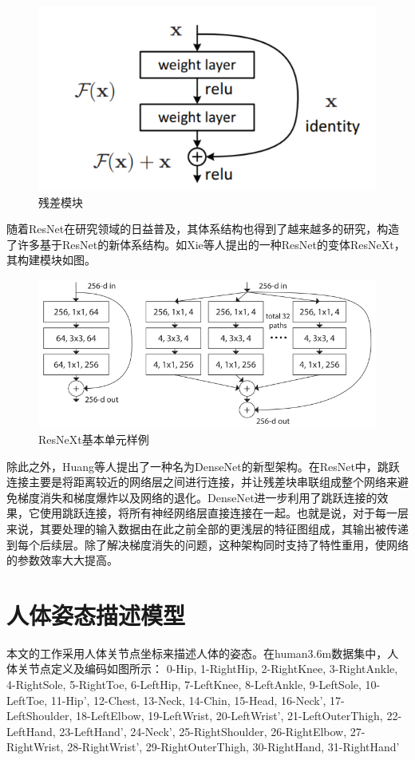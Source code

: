\begin{figure}[h]
	\centering
	\includegraphics[scale=0.4]{figures/10.png}
	\caption{残差模块}
	\label{fig:f10}
\end{figure}

随着ResNet在研究领域的日益普及，其体系结构也得到了越来越多的研究，构造了许多基于ResNet的新体系结构。如Xie等人提出的一种ResNet的变体ResNeXt，其构建模块如图。

\begin{figure}[h]
	\centering
	\includegraphics[scale=0.4]{figures/11.png}
	\caption{ResNeXt基本单元样例}
	\label{fig:f11}
\end{figure}

除此之外，Huang等人提出了一种名为DenseNet的新型架构。在ResNet中，跳跃连接主要是将距离较近的网络层之间进行连接，并让残差块串联组成整个网络来避免梯度消失和梯度爆炸以及网络的退化。DenseNet进一步利用了跳跃连接的效果，它使用跳跃连接，将所有神经网络层直接连接在一起。也就是说，对于每一层来说，其要处理的输入数据由在此之前全部的更浅层的特征图组成，其输出被传递到每个后续层。除了解决梯度消失的问题，这种架构同时支持了特性重用，使网络的参数效率大大提高。



\section{人体姿态描述模型}
本文的工作采用人体关节点坐标来描述人体的姿态。在human3.6m数据集中，人体关节点定义及编码如图所示：
0-Hip, 1-RightHip, 2-RightKnee, 3-RightAnkle, 4-RightSole, 5-RightToe, 6-LeftHip, 7-LeftKnee, 8-LeftAnkle, 9-LeftSole, 10-LeftToe, 11-Hip’, 12-Chest, 13-Neck, 14-Chin, 15-Head, 16-Neck’, 17-LeftShoulder, 18-LeftElbow, 19-LeftWrist, 20-LeftWrist’, 21-LeftOuterThigh, 22-LeftHand, 23-LeftHand’, 24-Neck’, 25-RightShoulder, 26-RightElbow, 27-RightWrist, 28-RightWrist’, 29-RightOuterThigh, 30-RightHand, 31-RightHand’

